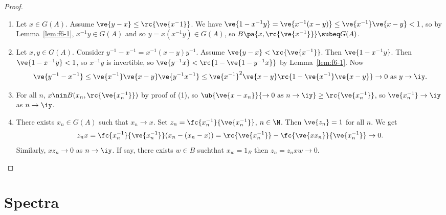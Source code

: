 \begin{proof}
\begin{enumerate}
\item
Let $x\in G(A)$. Assume $\ve{y-x}\le \rc{\ve{x^-1}}$. We have $\ve{1-x^{-1}y}=\ve{x^{-1}(x-y)}\le \ve{x^{-1}}\ve{x-y}<1$, so by Lemma~\ref{lem:f6-1}, $x^{-1}y\in G(A)$ and so $y=x(x^{-1}y)\in G(A)$, so $B\pa{x,\rc{\ve{x^{-1}}}}\subeq G(A)$.
\item Let $x,y\in G(A)$. Consider $y^{-1}-x^{-1}=x^{-1}(x-y)y^{-1}$. Assume $\ve{y-x}<\rc{\ve{x^{-1}}}$. Then $\ve{1-x^{-1}y}$. Then $\ve{1-x^{-1}y}<1$, so $x^{-1}y$ is invertible, so $\ve{y^{-1}x}<\rc{1-\ve{1-y^{-1}x}}$ by Lemma~\ref{lem:f6-1}. Now 
\[\ve{y^{-1}-x^{-1}}\le \ve{x^{-1}}\ve{x-y}\ve{y^{-1}x^{-1}}\le \ve{x^{-1}}^2 \ve{x-y}\rc{1-\ve{x^{-1}}\ve{x-y}}\to 0\text{ as }y\to \iy.\]
\item For all $n$, $x\nin B(x_n,\rc{\ve{x_n^{-1}}})$ by proof of (1), so $\ub{\ve{x-x_n}}{\to 0 \text{ as }n\to \iy}\ge \rc{\ve{x_n^{-1}}}$, so $\ve{x_n^{-1}}\to \iy$ as $n\to \iy$. 
\item
There exists $x_n\in G(A)$ such that $x_n\to x$. Set $z_n=\fc{x_n^{-1}}{\ve{x_n^{-1}}}$, $n\in \N$. Then $\ve{z_n}=1$ for all $n$. We get
\[
z_nx=\fc{x_n^{-1}}{\ve{x_n^{-1}}} (x_n-(x_n-x))=\rc{\ve{x_n^{-1}}}-\fc{\ve{xx_n}}{\ve{x_n^{-1}}}\to 0.
\]
Similarly, $xz_n\to 0$ as $n\to \iy$. If say, there exists $w\in B$ suchthat $x_w=1_B$ then $z_n=z_nxw\to 0$.
\end{enumerate}
\end{proof}

\section{Spectra}

